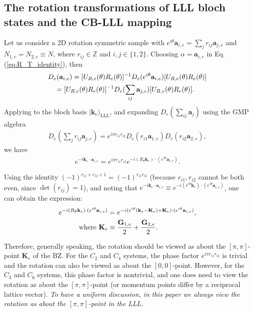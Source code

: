 \begin{subappendices}
\section{The rotation transformations of LLL bloch states and the CB-LLL mapping}\label{app:mag_rot}
Let us consider a 2D rotation symmetric sample with $e^{i\theta}\mathbf a_{i,e}= \sum_j r_{ij}\mathbf a_{j,e}$ and $N_{1,e}=N_{2,e}\equiv N$, where $r_{ij}\in\mathbb Z$ and $i,j\in\{1,2\}$. Choosing $\alpha=\mathbf a_{i,e}$ in Eq.(\ref{eq:R_T_identity}), then
\begin{align}
&D_e(\mathbf a_{i,e})=[U_{R,e}(\theta)R_e(\theta)]^{-1} D_e(e^{i\theta}\mathbf a_{i,e})[U_{R,e}(\theta)R_e(\theta)]\notag\\
&\quad=[U_{R,e}(\theta)R_e(\theta)]^{-1} D_e(\sum_{ij}\mathbf a_{j,e})[U_{R,e}(\theta)R_e(\theta)].
\end{align}
Applying to the bloch basis $|\mathbf k_e\rangle_{\text{LLL}}$, and expanding $D_e(\sum_{ij}\mathbf a_j)$ using the GMP algebra
\begin{align}
D_e(\sum_j r_{ij}\mathbf a_{j,e})=e^{i\pi r_{i1}r_{i2}}D_e( r_{i1}\mathbf a_{1,e})D_e( r_{i2}\mathbf a_{2,e}),
\end{align}
we have
\begin{align}
e^{-i \mathbf k_e\cdot \mathbf a_{i,e}}=e^{i\pi r_{i1}r_{i2}} e^{-i (R_{\theta}\mathbf k_e)\cdot  (e^{i\theta}\mathbf a_{i,e})}.
\end{align}


Using the identity $(-1)^{r_{i1}+r_{i2}+1}=(-1)^{r_{i1}r_{i2}}$ (because $r_{i1},r_{i2}$ cannot be both even, since $\det(r_{ij})=1$), and noting that $e^{-i \mathbf k_e\cdot \mathbf a_{i,e}}\equiv e^{-i (e^{i\theta}\mathbf k_e)\cdot (e^{i\theta}\mathbf a_{i,e})}$, one can obtain the expression:
\begin{align}
e^{-i (R_{\theta}\mathbf k_e)\cdot  (e^{i\theta}\mathbf a_{i,e})}&=e^{-i (e^{i\theta}(\mathbf k_e-\mathbf K_e)+\mathbf K_e)\cdot (e^{i\theta}\mathbf a_{i,e})},\notag\\
\text{where }\mathbf K_e&\equiv \frac{\mathbf G_{1,e}}{2}+\frac{\mathbf G_{2,e}}{2}.
\end{align}

Therefore, generally speaking, the rotation should be viewed as about the $[\pi,\pi]$-point $\mathbf K_e$ of the BZ. For the $C_2$ and $C_4$ systems, the phase factor $e^{i\pi r_{i1}r_{i2}}$ is trivial and the rotation can also be viewed as about the $[0,0]$-point. However, for the $C_3$ and $C_6$ systems, this phase factor is nontrivial, and one does need to view the rotation as about the $[\pi,\pi]$-point (or momentum points differ by a reciprocal lattice vector). \emph{To have a uniform discussion, in this paper we always view the rotation as about the $[\pi,\pi]$-point in the LLL.}


\end{subappendices}
